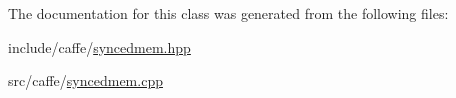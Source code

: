 The documentation for this class was generated from the following files\+:\begin{DoxyCompactItemize}
\item 
include/caffe/\hyperlink{syncedmem_8hpp}{syncedmem.\+hpp}\item 
src/caffe/\hyperlink{syncedmem_8cpp}{syncedmem.\+cpp}\end{DoxyCompactItemize}
